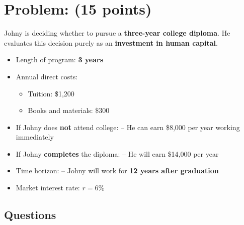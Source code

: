 \documentclass[12pt]{article}
\begin{document}
\section*{Problem: (15 points) }

Johny is deciding whether to pursue a \textbf{three-year college diploma}. He evaluates this decision purely as an \textbf{investment in human capital}.


\begin{itemize}
    \item Length of program: \textbf{3 years}
    
    \item Annual direct costs:
    \begin{itemize}
        \item Tuition: \$1{,}200
        \item Books and materials: \$300
    \end{itemize}
    
    \item If Johny does \textbf{not} attend college: -- He can earn \$8{,}000 per year working immediately
  
    
    \item If Johny \textbf{completes} the diploma: -- He will earn \$14{,}000 per year

    
    \item Time horizon: -- Johny will work for \textbf{12 years after graduation}
    
    
    \item Market interest rate:  \( r = 6\% \)
    
\end{itemize}

\subsection*{Questions}
\end{document}
